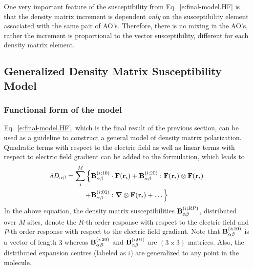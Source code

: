 \documentclass[aip,amsmath,amssymb,reprint]{revtex4-1}
\newcommand{\BM}[1]{\bm{#1}}
\begin{document}
One very important feature of the susceptibility from Eq.~\eqref{e:final-model.HF} is that
the density matrix increment is dependent \emph{only} on the susceptibility element associated with the same
pair of AO's. Therefore, there is no mixing in the AO's, rather the increment is proportional to the 
vector susceptibility, different for each density matrix element.

\subsection{Generalized Density Matrix Susceptibility Model}

\subsubsection{Functional form of the model}

Eq.~\eqref{e:final-model.HF}, which is the final result of the previous section, 
can be used as a guideline to construct a general model of density matrix polarization.
Quadratic terms with respect to the electric field as well as linear terms with respect to
electric field gradient can be added to the formulation, which leads to
%
\begin{multline}\label{e:final-model.General}
 \delta D_{\alpha\beta} = \sum_{i }^M \Big\{
                                      {\bf B}^{(i ; 10)}_{\alpha\beta} \cdot {\bf F}({\bf r}_i)  
                        +             {\bf B}^{(i ; 20)}_{\alpha\beta} : {\bf F}({\bf r}_i) \otimes {\bf F}({\bf r}_i) \\
                        +             {\bf B}^{(i ; 01)}_{\alpha\beta} : {\BM\nabla} \otimes {\bf F}({\bf r}_i) 
                        + \ldots \Big\}
\end{multline}
%
In the above equation, the density matrix susceptibilities
${\bf B}^{(i; RP)}_{\alpha\beta}$, distributed over $M$ sites,
denote the $R$-th order response with respect to the electric field
and $P$-th order response with respect to the electric field gradient. Note that
${\bf B}^{(i; 10)}_{\alpha\beta}$ is a vector of length $3$ whereas ${\bf B}^{(i; 20)}_{\alpha\beta}$
and ${\bf B}^{(i; 01)}_{\alpha\beta}$ are $(3\times 3)$ matrices. Also, the distributed expansion centres
(labeled as $i$) are generalized to any point in the molecule.
\end{document}
